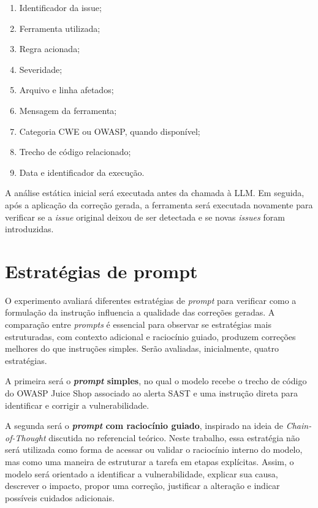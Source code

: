 \begin{enumerate}
    \item Identificador da issue;
    \item Ferramenta utilizada;
    \item Regra acionada;
    \item Severidade;
    \item Arquivo e linha afetados;
    \item Mensagem da ferramenta;
    \item Categoria CWE ou OWASP, quando disponível;
    \item Trecho de código relacionado;
    \item Data e identificador da execução.
\end{enumerate}

A análise estática inicial será executada antes da chamada à LLM. Em seguida, após a aplicação da correção gerada, a ferramenta será executada novamente para verificar se a \textit{issue} original deixou de ser detectada e se novas \textit{issues} foram introduzidas.

\section{Estratégias de prompt}

O experimento avaliará diferentes estratégias de \textit{prompt} para verificar como a formulação da instrução influencia a qualidade das correções geradas. A comparação entre \textit{prompts} é essencial para observar se estratégias mais estruturadas, com contexto adicional e raciocínio guiado, produzem correções melhores do que instruções simples. Serão avaliadas, inicialmente, quatro estratégias.

A primeira será o\textbf{ \textit{prompt} simples}, no qual o modelo recebe o trecho de código do OWASP Juice Shop associado ao alerta SAST e uma instrução direta para identificar e corrigir a vulnerabilidade.

A segunda será o \textbf{\textit{prompt} com raciocínio guiado}, inspirado na ideia de \textit{Chain-of-Thought} discutida no referencial teórico. Neste trabalho, essa estratégia não será utilizada como forma de acessar ou validar o raciocínio interno do modelo, mas como uma maneira de estruturar a tarefa em etapas explícitas. Assim, o modelo será orientado a identificar a vulnerabilidade, explicar sua causa, descrever o impacto, propor uma correção, justificar a alteração e indicar possíveis cuidados adicionais.

